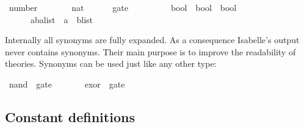 %
\begin{isabellebody}%
\def\isabellecontext{types}%
\ number\ \ \ \ \ \ \ {\isacharequal}\ nat\isanewline
\ \ \ \ \ \ gate\ \ \ \ \ \ \ \ \ {\isacharequal}\ {\isachardoublequote}bool\ {\isasymRightarrow}\ bool\ {\isasymRightarrow}\ bool{\isachardoublequote}\isanewline
\ \ \ \ \ \ {\isacharparenleft}{\isacharprime}a{\isacharcomma}{\isacharprime}b{\isacharparenright}alist\ {\isacharequal}\ {\isachardoublequote}{\isacharparenleft}{\isacharprime}a\ {\isasymtimes}\ {\isacharprime}b{\isacharparenright}list{\isachardoublequote}%
\begin{isamarkuptext}%
\noindent{}%
Internally all synonyms are fully expanded.  As a consequence Isabelle's
output never contains synonyms.  Their main purpose is to improve the
readability of theories.  Synonyms can be used just like any other
type:%
\end{isamarkuptext}%
\ nand\ {\isacharcolon}{\isacharcolon}\ gate\isanewline
\ \ \ \ \ \ \ exor\ {\isacharcolon}{\isacharcolon}\ gate%
\begin{isamarkuptext}%
\subsection{Constant definitions}
\label{sec:ConstDefinitions}


\end{isamarkuptext}
\end{isabellebody}
